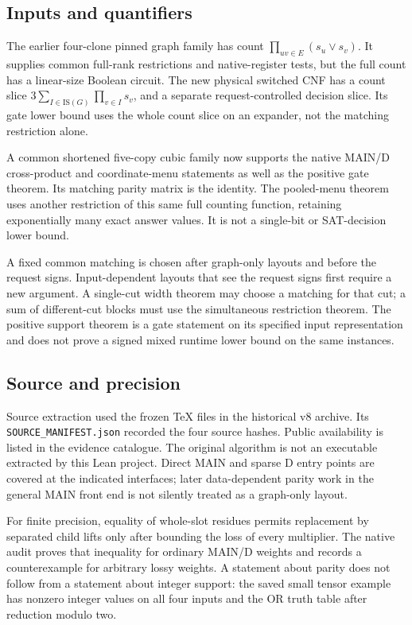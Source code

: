 \documentclass[
  11pt,
]{article}
\begin{document}
\subsection{Inputs and quantifiers}\label{v8-inputs-and-quantifiers}

The earlier four-clone pinned graph family has count
\(\prod_{uv\in E}(s_u\lor s_v)\). It supplies common full-rank
restrictions and native-register tests, but the full count has a
linear-size Boolean circuit. The new physical switched CNF has a count
slice \(3\sum_{I\in\mathrm{IS}(G)}\prod_{v\in I}s_v\), and a separate
request-controlled decision slice. Its gate lower bound uses the whole
count slice on an expander, not the matching restriction alone.

A common shortened five-copy cubic family now supports the native MAIN/D
cross-product and coordinate-menu statements as well as the positive
gate theorem. Its matching parity matrix is the identity. The
pooled-menu theorem uses another restriction of this same full counting
function, retaining exponentially many exact answer values. It is not a
single-bit or SAT-decision lower bound.

A fixed common matching is chosen after graph-only layouts and before
the request signs. Input-dependent layouts that see the request signs
first require a new argument. A single-cut width theorem may choose a
matching for that cut; a sum of different-cut blocks must use the
simultaneous restriction theorem. The positive support theorem is a gate
statement on its specified input representation and does not prove a
signed mixed runtime lower bound on the same instances.

\subsection{Source and precision}\label{v8-source-and-precision}

Source extraction used the frozen TeX files in the historical v8
archive. Its \nolinkurl{SOURCE_MANIFEST.json} recorded the four source
hashes. Public availability is listed in the evidence catalogue. The original algorithm is not an
executable extracted by this Lean project. Direct MAIN and sparse D
entry points are covered at the indicated interfaces; later
data-dependent parity work in the general MAIN front end is not silently
treated as a graph-only layout.

For finite precision, equality of whole-slot residues permits
replacement by separated child lifts only after bounding the loss of
every multiplier. The native audit proves that inequality for ordinary
MAIN/D weights and records a counterexample for arbitrary lossy weights.
A statement about parity does not follow from a statement about integer
support: the saved small tensor example has nonzero integer values on
all four inputs and the OR truth table after reduction modulo two.
\end{document}
